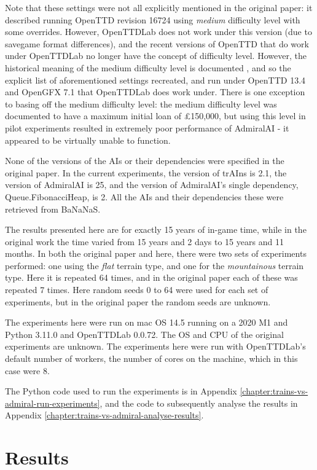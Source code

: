 \documentclass[logo,msc,dsti]{style/infthesis}    %
\begin{document}
{Note that these settings were not all explicitly mentioned in the original paper: it described running OpenTTD revision 16724 using \emph{medium} difficulty level with some overrides. However, OpenTTDLab does not work under this version (due to savegame format differences), and the recent versions of OpenTTD that do work under OpenTTDLab no longer have the concept of difficulty level. However, the historical meaning of the medium difficulty level is documented \cite{OpenTTDDifficultyLevels}, and so the explicit list of aforementioned settings recreated, and run under OpenTTD 13.4 and OpenGFX 7.1 that OpenTTDLab does work under. There is one exception to basing off the medium difficulty level: the medium difficulty level was documented to have a maximum initial loan of £150,000, but using this level in pilot experiments resulted in extremely poor performance of AdmiralAI - it appeared to be virtually unable to function.

None of the versions of the AIs or their dependencies were specified in the original paper. In the current experiments, the version of trAIns is 2.1,  the version of AdmiralAI is 25, and the version of AdmiralAI's single dependency, Queue.FibonacciHeap, is 2. All the AIs and their dependencies these were retrieved from BaNaNaS.

The results presented here are for exactly 15 years of in-game time, while in the original work the time varied from 15 years and 2 days to 15 years and 11 months. In both the original paper and here, there were two sets of experiments performed: one using the \emph{flat} terrain type, and one for the \emph{mountainous} terrain type. Here it is repeated 64 times, and in the original paper each of these was repeated 7 times. Here random seeds 0 to 64 were used for each set of experiments, but in the original paper the random seeds are unknown.

The experiments here were run on mac OS 14.5 running on a 2020 M1 and Python 3.11.0 and OpenTTDLab 0.0.72. The OS and CPU of the original experiments are unknown. The experiments here were run with OpenTTDLab's default number of workers, the number of cores on the machine, which in this case were 8.

The Python code used to run the experiments is in Appendix \ref{chapter:trains-vs-admiral-run-experiments}, and the code to subsequently analyse the results in Appendix \ref{chapter:trains-vs-admiral-analyse-results}.

\section{Results}

}
\end{document}
